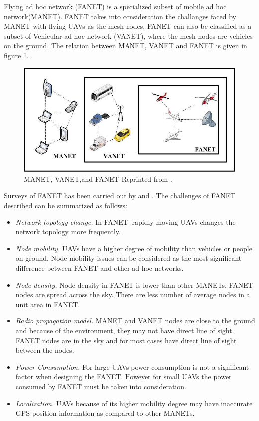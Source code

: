 Flying ad hoc network (FANET) is a specialized subset of mobile ad hoc network(MANET). FANET takes into consideration the challanges faced by MANET with flying UAVs as the mesh nodes. FANET can also be classified as a subset of Vehicular ad hoc network (VANET), where the mesh nodes are vehicles on the ground. The relation between MANET, VANET and FANET is given in figure \ref{fig:manet-vanet-and-fanet}.

\begin{figure}
	\centering
	\includegraphics[width=5in]{figures/literature/MANET-VANET-and-FANET}
	\caption[MANET, VANET and FANET]{\small 
		MANET, VANET,and FANET Reprinted from . }
	\label{fig:manet-vanet-and-fanet}
\end{figure}

Surveys of FANET has been carried out by  and . The challenges of FANET described can be summarized as follows:

\begin{itemize}
	\item \textit{Network topology change.} In FANET, rapidly moving UAVs changes the network topology more frequently.
	\item \textit{Node mobility.} UAVs have a higher degree of mobility than vehicles or people on ground. Node mobility issues can be considered as the most significant difference between FANET and other ad hoc networks.
	\item \textit{Node density.} Node density in FANET is lower than other MANETs. FANET nodes are spread across the sky. There are less number of average nodes in a unit area in FANET. 
	\item \textit{Radio propagation model.} MANET and VANET nodes are close to the ground and because of the environment, they may not have direct line of sight. FANET nodes are in the sky and for most cases have direct line of sight between the nodes.
	\item \textit{Power Consumption.} For large UAVs power consumption is not a significant factor when designing the FANET. However for small UAVs the power consumed by FANET must be taken into consideration.  
	\item \textit{Localization.} UAVs because of its higher mobility degree may have inaccurate GPS position information as compared to other MANETs.	
\end{itemize}

